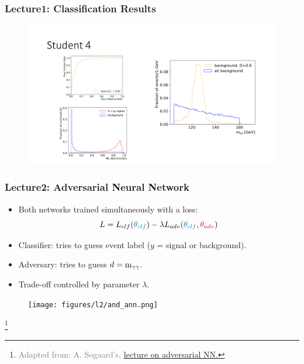 \documentclass[11pt,xcolor=dvipsnames,aspectratio=169]{beamer}
\newcommand\blfootnote[1]{%
  \begingroup
  \renewcommand\thefootnote{}\footnote{\hspace{-30pt}\textcolor{Gray}{\tiny #1}}%
  \addtocounter{footnote}{-1}%
  \endgroup
}
\begin{document}
\begin{frame}
  \frametitle{\bf Lecture1: Classification Results}
  \vspace{-5pt}
      \begin{figure}
        \includegraphics[width=1.00\textwidth]{figures/l3/7.pdf}
      \end{figure}
\end{frame}

\begin{frame}
  \frametitle{\bf Lecture2: Adversarial Neural Network}
  \begin{itemize}
  \item Both networks trained simultaneously with a loss:
    $$ L = L_{clf}(\textcolor{EDBBlue}{\theta_{clf}})-\lambda L_{adv}(\textcolor{EDBBlue}{\theta_{clf}},\textcolor{EDBRed}{\theta_{adv}}) $$
  \item \textcolor{EDBBlue}{Classifier:} tries to guess event label ($y$ = signal or background).
  \item \textcolor{EDBRed}{Adversary:} tries to guess $d=\mathrm{m}_{\gamma\gamma}{}$.   
  \item Trade-off controlled by parameter $\lambda$.
  \end{itemize}
  \begin{figure}
    \texttt{[image: figures/l2/and\_ann.png]}
  \end{figure}
  \blfootnote{Adapted from: A. Sogaard's,
    \href{https://github.com/asogaard/ep2mlf/blob/master/01-adversarial/2018-11-13_EP2MLF_AndreasSogaard.pdf}{lecture
    on adversarial NN.}}
\end{frame}
\end{document}
